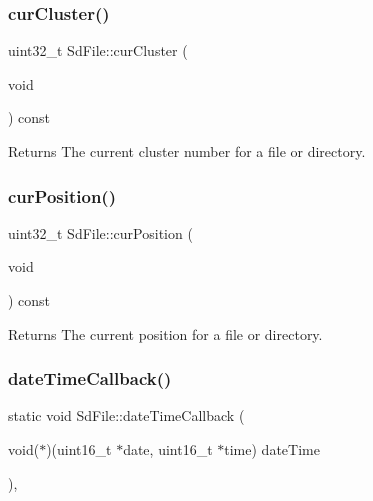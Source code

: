 \subsubsection{\texorpdfstring{cur\+Cluster()}{curCluster()}}
{\footnotesize\ttfamily uint32\+\_\+t Sd\+File\+::cur\+Cluster (\begin{DoxyParamCaption}\item[{void}]{ }\end{DoxyParamCaption}) const\hspace{0.3cm}{\ttfamily [inline]}}

\begin{DoxyReturn}{Returns}
The current cluster number for a file or directory. 
\end{DoxyReturn}
\mbox{\label{class_sd_file_a6105ae2f1c23e99fdea17bc64571ea8c}} 
\subsubsection{\texorpdfstring{cur\+Position()}{curPosition()}}
{\footnotesize\ttfamily uint32\+\_\+t Sd\+File\+::cur\+Position (\begin{DoxyParamCaption}\item[{void}]{ }\end{DoxyParamCaption}) const\hspace{0.3cm}{\ttfamily [inline]}}

\begin{DoxyReturn}{Returns}
The current position for a file or directory. 
\end{DoxyReturn}
\mbox{\label{class_sd_file_a2d78e6a8cedbf8ce545af68457b43bf1}} 
\subsubsection{\texorpdfstring{date\+Time\+Callback()}{dateTimeCallback()}\hspace{0.1cm}{\footnotesize\ttfamily [1/2]}}
{\footnotesize\ttfamily static void Sd\+File\+::date\+Time\+Callback (\begin{DoxyParamCaption}\item[{void($\ast$)(uint16\+\_\+t $\ast$date, uint16\+\_\+t $\ast$time)}]{date\+Time }\end{DoxyParamCaption})\hspace{0.3cm}{\ttfamily [inline]}, {\ttfamily [static]}}


